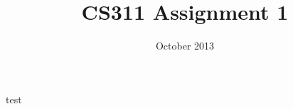 \documentclass[letterpaper,10pt]{article}
\title{CS311 Assignment 1}
\author{\name}
\date{October 2013}
\begin{document}
\maketitle

test
\end{document}
